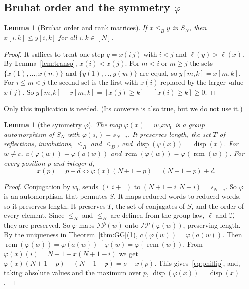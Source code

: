 \documentclass[11pt]{amsart}
\newtheorem{lemma}[theorem]{Lemma}
\theoremstyle{definition}
\theoremstyle{remark}
\numberwithin{equation}{section}
\newcommand{\IP}{\mathcal{IP}}
\newcommand{\leR}{\le_R}
\newcommand{\leB}{\le_B}
\DeclareMathOperator{\rem}{rem}
\DeclareMathOperator{\disp}{disp}
\begin{document}
\subsection{Bruhat order and the symmetry \texorpdfstring{\(\varphi\)}{phi}}

\begin{lemma}[Bruhat order and rank matrices]\label{lem:rankmatrix}
If \(x\leB y\) in \(S_N\), then \(x[i,k]\le y[i,k]\) for all \(i,k\in[N]\).
\end{lemma}

\begin{proof}
It suffices to treat one step \(y=x(i\ j)\) with \(i<j\) and \(\ell(y)>\ell(x)\). By Lemma~\ref{lem:transp}, \(x(i)<x(j)\). For \(m<i\) or \(m\ge j\) the sets \(\{x(1),\dots,x(m)\}\) and \(\{y(1),\dots,y(m)\}\) are equal, so \(y[m,k]=x[m,k]\). For \(i\le m<j\) the second set is the first with \(x(i)\) replaced by the larger value \(x(j)\). So \(y[m,k]-x[m,k]=[x(j)\ge k]-[x(i)\ge k]\ge0\).
\end{proof}

Only this implication is needed. (Its converse is also true, but we do not use it.)

\begin{lemma}[the symmetry \(\varphi\)]\label{lem:phi}
The map \(\varphi(x)=w_0xw_0\) is a group automorphism of \(S_N\) with \(\varphi(s_i)=s_{N-i}\). It preserves length, the set \(T\) of reflections, involutions, \(\leR\) and \(\leB\), and \(\disp(\varphi(x))=\disp(x)\). For \(w\neq e\), \(a(\varphi(w))=\varphi(a(w))\) and \(\rem(\varphi(w))=\varphi(\rem(w))\). For every position \(p\) and integer \(d\),
\begin{equation}\label{eq:phiflip}
x(p)=p-d\iff \varphi(x)(N+1-p)=(N+1-p)+d.
\end{equation}
\end{lemma}

\begin{proof}
Conjugation by \(w_0\) sends \((i\ \ i+1)\) to \((N+1-i\ \ N-i)=s_{N-i}\). So \(\varphi\) is an automorphism that permutes \(S\). It maps reduced words to reduced words, so it preserves length. It preserves \(T\), the set of conjugates of \(S\), and the order of every element. Since \(\leR\) and \(\leB\) are defined from the group law, \(\ell\) and \(T\), they are preserved. So \(\varphi\) maps \(\IP(w)\) onto \(\IP(\varphi(w))\), preserving length. By the uniqueness in Theorem~\ref{thm:GG}(1), \(a(\varphi(w))=\varphi(a(w))\). Then \(\rem(\varphi(w))=\varphi(a(w))^{-1}\varphi(w)=\varphi(\rem(w))\). From \(\varphi(x)(i)=N+1-x(N+1-i)\) we get \(\varphi(x)(N+1-p)-(N+1-p)=p-x(p)\). This gives~\eqref{eq:phiflip}, and, taking absolute values and the maximum over \(p\), \(\disp(\varphi(x))=\disp(x)\).
\end{proof}
\end{document}
